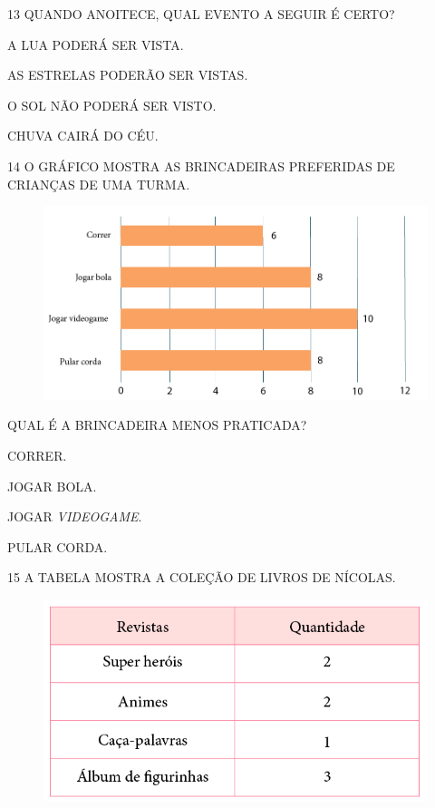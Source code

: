 \num{13} QUANDO ANOITECE, QUAL EVENTO A SEGUIR É CERTO?

\begin{escolha}[itemsep=0pt]
\item A LUA PODERÁ SER VISTA.

\item AS ESTRELAS PODERÃO SER VISTAS.

\item O SOL NÃO PODERÁ SER VISTO.

\item CHUVA CAIRÁ DO CÉU.
\end{escolha}

\num{14} O GRÁFICO MOSTRA AS BRINCADEIRAS PREFERIDAS DE CRIANÇAS DE UMA TURMA.

\begin{figure}[htpb!]
\includegraphics[width=\textwidth]{./media/SAEB_1ANO_MAT_FIGURA134.png}
\end{figure}

\pagebreak
QUAL É A BRINCADEIRA MENOS PRATICADA?

\begin{escolha}[itemsep=0pt]
\item CORRER.

\item JOGAR BOLA.

\item JOGAR \textit{VIDEOGAME}.

\item PULAR CORDA.
\end{escolha}

\num{15} A TABELA MOSTRA A COLEÇÃO DE LIVROS DE NÍCOLAS.

\begin{figure}[htpb!]
\includegraphics[width=\textwidth]{./media/SAEB_1ANO_MAT_FIGURA135.png}
\end{figure}

